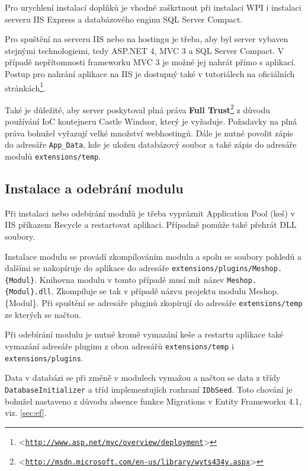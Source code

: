 \documentclass[11pt,twoside,a4paper]{book}
\let\oldUrl\url
\renewcommand\url[1]{<\texttt{\oldUrl{#1}}>}
\begin{document}
Pro urychlení instalací doplňků je vhodné zaškrtnout při instalaci WPI i instalaci serveru IIS Express a databázového enginu SQL Server Compact.

Pro spuštění na serveru IIS nebo na hostingu je třeba, aby byl server vybaven stejnými technologiemi, tedy ASP.NET 4, MVC 3 a SQL Server Compact. V případě nepřítomnosti frameworku MVC 3 je možné jej nahrát přímo s aplikací. Postup pro nahrání aplikace na IIS je dostupný také v tutoriálech na oficiálních stránkách\footnote{\url{http://www.asp.net/mvc/overview/deployment}}.

Také je důležité, aby server poskytoval plná práva \textbf{Full Trust}\footnote{\url{http://msdn.microsoft.com/en-us/library/wyts434y.aspx}} z důvodu používání IoC kontejneru Castle Windsor, který je vyžaduje. Požadavky na plná práva bohužel vyřazují velké množství webhostingů. Dále je nutné povolit zápis do adresáře \texttt{App\_Data}, kde je uložen databázový soubor a také zápis do adresáře modulů \texttt{extensions/temp}.



\subsection{Instalace a odebrání modulu}
Při instalaci nebo odebírání modulů je třeba vypráznit \textsf{Application Pool} (keš) v IIS příkazem \textsf{Recycle} a restartovat aplikaci. Případně pomůže také přehrát DLL soubory.

Instalace modulu se provádí zkompilováním modulu a spolu se soubory pohledů a dalšími se nakopíruje do aplikace do adresáře \texttt{extensions/plugins/Meshop.\{Modul\}}. Knihovna modulu v tomto případě musí mít název \texttt{Meshop.\{Modul\}.dll}. Zkompiluje se tak v případě názvu projektu modulu \textsf{Meshop.\{Modul\}}. Při spuštění se adresáře pluginů zkopírují do adresáře \texttt{extensions/temp} ze kterých se načtou.

Při odebírání modulu je nutné kromě vymazání keše a restartu aplikace také vymazání adresáře pluginu z obou adresářů \texttt{extensions/temp} i \texttt{extensions/plugins}.

Data v databázi se při změně v modulech vymažou a načtou se data z třídy \texttt{Database\-Initializer} a tříd implementujích rozhraní \texttt{IDbSeed}. Toto chování je bohužel nastaveno z důvodu absence funkce \textsf{Migrations} v Entity Frameworku 4.1, viz. \ref{sec:ef}.

\end{document}
